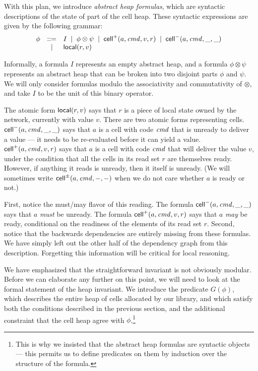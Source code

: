 With this plan, we introduce \emph{abstract heap formulas}, which are
syntactic descriptions of the state of part of the cell heap. These
syntactic expressions are given by the following grammar:
\begin{displaymath}
  \begin{array}{lcl}
    \phi & ::= & I \;\;|\;\; \phi \otimes \psi \;\;|\;\; \mathsf{cell}^{+}({a}, {\mathit{cmd}}, {v}, {r}) \;\;|\;\; \mathsf{cell}^{-}({a}, {\mathit{cmd}}, {\_}, {\_})\\
         &  |  & \mathsf{local}({r}, {v}) 
  \end{array}
\end{displaymath}

Informally, a formula $I$ represents an empty abstract heap, and a
formula $\phi \otimes \psi$ represents an abstract heap that can be
broken into two disjoint parts $\phi$ and $\psi$. We will only
consider formulas modulo the associativity and commutativity of
$\otimes$, and take $I$ to be the unit of this binary operator.

The atomic form $\mathsf{local}({r}, {v})$ says that $r$ is a piece of local
state owned by the network, currently with value $v$. There are two
atomic forms representing cells. $\mathsf{cell}^{-}({a}, {\mathit{cmd}}, {\_}, {\_})$ says that $a$ is
a cell with code $\mathit{cmd}$ that is unready to deliver a value --- it
needs to be re-evaluated before it can yield a
value. $\mathsf{cell}^{+}({a}, {\mathit{cmd}}, {v}, {r})$ says that $a$ is a cell with code
$\mathit{cmd}$ that will deliver the value $v$, under the condition that all
the cells in its read set $r$ are themselves ready. However, if
anything it reads is unready, then it itself is unready. (We will
sometimes write $\mathsf{cell}^{\pm}({a}, {\mathit{cmd}}, {-}, {-})$ when we do not care whether $a$
is ready or not.)

First, notice the must/may flavor of this reading. The formula
$\mathsf{cell}^{-}({a}, {\mathit{cmd}}, {\_}, {\_})$ says that $a$ \emph{must} be unready.  The formula
$\mathsf{cell}^{+}({a}, {\mathit{cmd}}, {v}, {r})$ says that $a$ \emph{may} be ready,
conditional on the readiness of the elements of its read set
$r$. Second, notice that the backwards dependencies are entirely
missing from these formulas. We have simply left out the other half of
the dependency graph from this description. Forgetting this
information will be critical for local reasoning.

We have emphasized that the straightforward invariant is not obviously
modular. Before we can elaborate any further on this point, we will
need to look at the formal statement of the heap invariant. We
introduce the predicate $G(\phi)$, which describes the entire heap of
cells allocated by our library, and which satisfy both the conditions
described in the previous section, and the additional constraint that
the cell heap agree with $\phi$.\footnote{This is why we insisted that
  the abstract heap formulas are syntactic objects --- this permits us
  to define predicates on them by induction over the structure of the
formula.}


